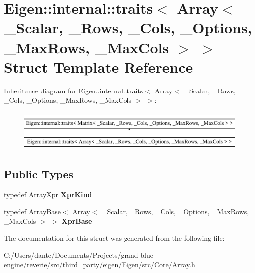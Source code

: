 \hypertarget{struct_eigen_1_1internal_1_1traits_3_01_array_3_01___scalar_00_01___rows_00_01___cols_00_01___ope9eba6bf714e124241d092a6dc222cb7}{}\section{Eigen\+::internal\+::traits$<$ Array$<$ \+\_\+\+Scalar, \+\_\+\+Rows, \+\_\+\+Cols, \+\_\+\+Options, \+\_\+\+Max\+Rows, \+\_\+\+Max\+Cols $>$ $>$ Struct Template Reference}
\label{struct_eigen_1_1internal_1_1traits_3_01_array_3_01___scalar_00_01___rows_00_01___cols_00_01___ope9eba6bf714e124241d092a6dc222cb7}
Inheritance diagram for Eigen\+::internal\+::traits$<$ Array$<$ \+\_\+\+Scalar, \+\_\+\+Rows, \+\_\+\+Cols, \+\_\+\+Options, \+\_\+\+Max\+Rows, \+\_\+\+Max\+Cols $>$ $>$\+:\begin{figure}[H]
\begin{center}
\leavevmode
\includegraphics[height=2.000000cm]{struct_eigen_1_1internal_1_1traits_3_01_array_3_01___scalar_00_01___rows_00_01___cols_00_01___ope9eba6bf714e124241d092a6dc222cb7}
\end{center}
\end{figure}
\subsection*{Public Types}
\begin{DoxyCompactItemize}
\item 
\mbox{\label{struct_eigen_1_1internal_1_1traits_3_01_array_3_01___scalar_00_01___rows_00_01___cols_00_01___ope9eba6bf714e124241d092a6dc222cb7_abb5cac484560c0fa7f7dc3d11c46e60c}} 
typedef \mbox{\hyperlink{struct_eigen_1_1_array_xpr}{Array\+Xpr}} {\bfseries Xpr\+Kind}
\item 
\mbox{\label{struct_eigen_1_1internal_1_1traits_3_01_array_3_01___scalar_00_01___rows_00_01___cols_00_01___ope9eba6bf714e124241d092a6dc222cb7_a5b5c49c6d0c55ea8e63ba9cd126ff1f1}} 
typedef \mbox{\hyperlink{class_eigen_1_1_array_base}{Array\+Base}}$<$ \mbox{\hyperlink{class_eigen_1_1_array}{Array}}$<$ \+\_\+\+Scalar, \+\_\+\+Rows, \+\_\+\+Cols, \+\_\+\+Options, \+\_\+\+Max\+Rows, \+\_\+\+Max\+Cols $>$ $>$ {\bfseries Xpr\+Base}
\end{DoxyCompactItemize}


The documentation for this struct was generated from the following file\+:\begin{DoxyCompactItemize}
\item 
C\+:/\+Users/dante/\+Documents/\+Projects/grand-\/blue-\/engine/reverie/src/third\+\_\+party/eigen/\+Eigen/src/\+Core/Array.\+h\end{DoxyCompactItemize}
